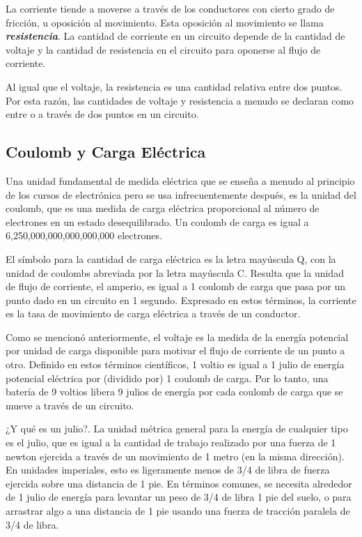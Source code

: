 \documentclass[output=paper, 
colorlinks,
citecolor=brown,
newtxmath
]{langscibook}
\begin{document}
La corriente tiende a moverse a través de los conductores con cierto grado de fricción, u oposición al movimiento. Esta oposición al movimiento se llama \textit{\textbf{resistencia}}. La cantidad de corriente en un circuito depende de la cantidad de voltaje y la cantidad de resistencia en el circuito para oponerse al flujo de corriente.

Al igual que el voltaje, la resistencia es una cantidad relativa entre dos puntos. Por esta razón, las cantidades de voltaje y resistencia a menudo se declaran como entre o a través de dos puntos en un circuito.


\subsection{Coulomb y Carga Eléctrica}
Una unidad fundamental de medida eléctrica que se enseña a menudo al principio de los cursos de electrónica pero se usa infrecuentemente después, es la unidad del coulomb, que es una medida de carga eléctrica proporcional al número de electrones en un estado desequilibrado. Un coulomb de carga es igual a 6,250,000,000,000,000,000 electrones.

El símbolo para la cantidad de carga eléctrica es la letra mayúscula Q, con la unidad de coulombs abreviada por la letra mayúscula C. Resulta que la unidad de flujo de corriente, el amperio, es igual a 1 coulomb de carga que pasa por un punto dado en un circuito en 1 segundo. Expresado en estos términos, la corriente es la tasa de movimiento de carga eléctrica a través de un conductor.

Como se mencionó anteriormente, el voltaje es la medida de la energía potencial por unidad de carga disponible para motivar el flujo de corriente de un punto a otro.  Definido en estos términos científicos, 1 voltio es igual a 1 julio de energía potencial eléctrica por (dividido por) 1 coulomb de carga. Por lo tanto, una batería de 9 voltios libera 9 julios de energía por cada coulomb de carga que se mueve a través de un circuito.

¿Y qué es un julio?. La unidad métrica general para la energía de cualquier tipo es el julio, que es igual a la cantidad de trabajo realizado por una fuerza de 1 newton ejercida a través de un movimiento de 1 metro (en la misma dirección). En unidades imperiales, esto es ligeramente menos de 3/4 de libra de fuerza ejercida sobre una distancia de 1 pie. En términos comunes, se necesita alrededor de 1 julio de energía para levantar un peso de 3/4 de libra 1 pie del suelo, o para arrastrar algo a una distancia de 1 pie usando una fuerza de tracción paralela de 3/4 de libra. 
\end{document}
